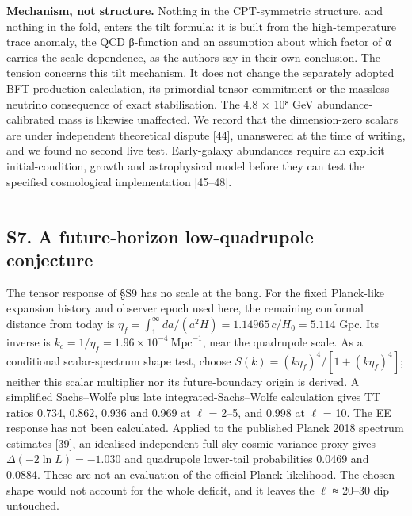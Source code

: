 \documentclass[
]{article}
\begin{document}
\textbf{Mechanism, not structure.} Nothing in the CPT-symmetric
structure, and nothing in the fold, enters the tilt formula: it is built
from the high-temperature trace anomaly, the QCD β-function and an
assumption about which factor of α carries the scale dependence, as the
authors say in their own conclusion. The tension concerns this tilt
mechanism. It does not change the separately adopted BFT production
calculation, its primordial-tensor commitment or the massless-neutrino
consequence of exact stabilisation. The 4.8 × 10⁸ GeV
abundance-calibrated mass is likewise unaffected. We record that the
dimension-zero scalars are under independent theoretical dispute
{[}44{]}, unanswered at the time of writing, and we found no second live
test. Early-galaxy abundances require an explicit initial-condition,
growth and astrophysical model before they can test the specified
cosmological implementation {[}45--48{]}.

\begin{center}\rule{0.5\linewidth}{0.5pt}\end{center}

\subsection{S7. A future-horizon low-quadrupole
conjecture}\label{s7.-a-future-horizon-low-quadrupole-conjecture}

The tensor response of §S9 has no scale at the bang. For the fixed
Planck-like expansion history and observer epoch used here, the
remaining conformal distance from today is
\(\eta_f=\int_1^\infty da/(a^2H)=1.14965\,c/H_0=5.114\) Gpc. Its inverse
is \(k_c=1/\eta_f=1.96\times10^{-4}\ \mathrm{Mpc}^{-1}\), near the
quadrupole scale. As a conditional scalar-spectrum shape test, choose
\(S(k)=(k\eta_f)^4/[1+(k\eta_f)^4]\); neither this scalar multiplier nor
its future-boundary origin is derived. A simplified Sachs--Wolfe plus
late integrated-Sachs--Wolfe calculation gives TT ratios 0.734, 0.862,
0.936 and 0.969 at \(\ell\) = 2--5, and 0.998 at \(\ell\) = 10. The EE
response has not been calculated. Applied to the published Planck 2018
spectrum estimates {[}39{]}, an idealised independent full-sky
cosmic-variance proxy gives \(\Delta(-2\ln L)=-1.030\) and quadrupole
lower-tail probabilities 0.0469 and 0.0884. These are not an evaluation
of the official Planck likelihood. The chosen shape would not account
for the whole deficit, and it leaves the \(\ell\) ≈ 20--30 dip
untouched.
\end{document}
